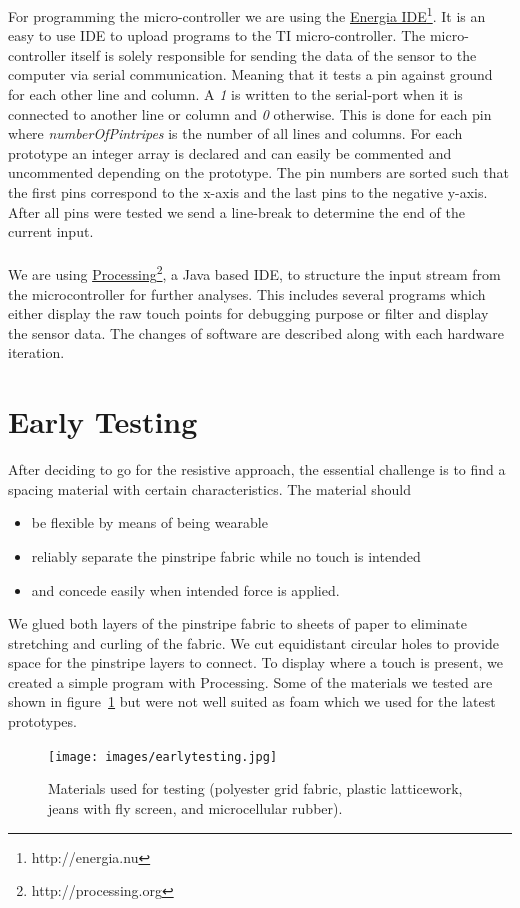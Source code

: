 For programming the micro-controller we are using the \href{http://energia.nu}{Energia IDE}\footnote{http://energia.nu}. It is an easy to use IDE to upload programs to the TI micro-controller. The micro-controller itself is solely responsible for sending the data of the sensor to the computer via serial communication. Meaning that it tests a pin against ground for each other line and column. A \emph{1} is written to the serial-port when it is connected to another line or column and \emph{0} otherwise. This is done for each pin where \emph{numberOfPintripes} is the number of all lines and columns. For each prototype an integer array is declared and can easily be commented and uncommented depending on the prototype. The pin numbers are sorted such that the first pins correspond to the x-axis and the last pins to the negative y-axis. After all pins were tested we send a line-break to determine the end of the current input.\\ \\

We are using \href{http://processing.org}{Processing}\footnote{http://processing.org}, a Java based IDE, to structure the input stream from the microcontroller for further analyses. This includes several programs which either display the raw touch points for debugging purpose or filter and display the sensor data. The changes of software are described along with each hardware iteration. 

\section{Early Testing}
After deciding to go for the resistive approach, the essential challenge is to find a spacing material with certain characteristics. The material should
\begin{itemize}
\item be flexible by means of being wearable
\item reliably separate the pinstripe fabric while no touch is intended
\item and concede easily when intended force is applied.
\end{itemize}
We glued both layers of the pinstripe fabric to sheets of paper to eliminate stretching and curling of the fabric. We cut equidistant circular holes to provide space for the pinstripe layers to connect. To display where a touch is present, we created a simple program with Processing. Some of the materials we tested are shown in figure~\ref{fig:earlymats} but were not well suited as foam which we used for the latest prototypes.
\begin{figure}
\texttt{[image: images/earlytesting.jpg]}
\caption{Materials used for testing (polyester grid fabric, plastic latticework, jeans with fly screen, and microcellular rubber).}
\label{fig:earlymats}
\end{figure}

